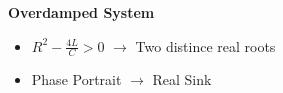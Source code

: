 \documentclass[preview]{standalone}
\begin{document}
\begin{center}
\textbf{Overdamped System}
                    \begin{itemize}
                        \item $R^2 - \frac{4L}{C} > 0$ $\rightarrow$ Two distince real roots
                        \item Phase Portrait $\rightarrow$ Real Sink
                    \end{itemize}
\end{center}
\end{document}

